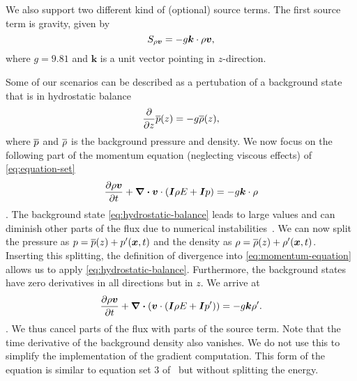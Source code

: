 We also support two different kind of (optional) source terms.
The first source term is gravity, given by
\begin{equation}\label{eq:source-gravity}
  \source[\Qj] = - g \bm{k} \cdot \Qj,
\end{equation}
where $g = 9.81$ and $\bm{k}$ is a unit vector pointing in $z$-direction.

\newcommand{\backgroundPressure}{\overline{\pressure}}
\newcommand{\backgroundRho}{\overline{\Qrho}}
Some of our scenarios can be described as a pertubation of a background state that is in hydrostatic balance
\begin{equation}
  \label{eq:hydrostatic-balance}
  \pdv{}{z} \backgroundPressure{\left (z \right )} = -g \backgroundRho(z),
\end{equation}
where $\backgroundPressure$ and $\backgroundRho$ is the background pressure and density.
We now focus on the following part of the momentum equation (neglecting viscous effects) of \cref{eq:equation-set}
\begin{equation}
  \label{eq:momentum-equation}
  \pdv{\Qj}{t}+ \divergence{
    \Qv \cdot \left( \bm{I} \QE + \bm{I} \pressure \right)
  }
  =
  -g \bm{k} \cdot \Qrho
\end{equation}.
The background state \cref{eq:hydrostatic-balance} leads to large values and can diminish other parts of the flux due to numerical instabilities~\cite{muller2010adaptive}.
We can now split the pressure as $\pressure = \backgroundPressure(z) + \pressure' (\bm{x}, t)$ and the density as $\Qrho = \backgroundRho(z) + \Qrho'(\bm{x}, t)$.
Inserting this splitting, the definition of divergence into \cref{eq:momentum-equation} allows us to apply \cref{eq:hydrostatic-balance}.
Furthermore, the background states have zero derivatives in all directions but in $z$.
We arrive at 
\begin{equation}
  \label{eq:momentum-equation-split}
  \pdv{\Qj}{t}+ \divergence \left(
    \Qv \cdot \left( \bm{I} \QE + \bm{I} \pressure' \right)
   \right)
  =
  -g \bm{k} \Qrho'.
\end{equation}.
We thus cancel parts of the flux with parts of the source term.
Note that the time derivative of the background density also vanishes.
We do not use this to simplify the implementation of the gradient computation.
This form of the equation is similar to equation set 3 of~\cite{giraldo2008study} but without splitting the energy.

